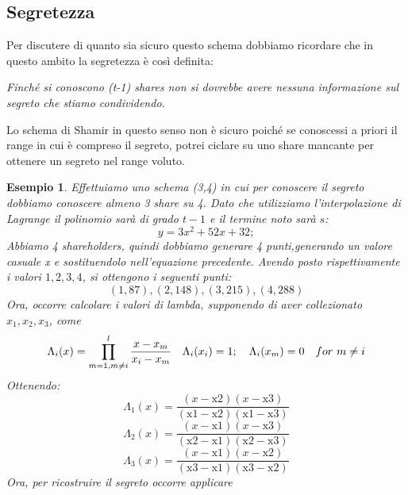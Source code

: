 \documentclass{book}
\newtheorem{esempio}{\textcolor{Grey1}{Esempio}}
\begin{document}
\subsection{Segretezza}
Per discutere di quanto sia sicuro questo schema dobbiamo ricordare che in questo ambito la segretezza è così definita:
\begin{center}
	\emph{Finché si conoscono (t-1) shares non si dovrebbe avere nessuna informazione sul segreto che stiamo condividendo.}
\end{center}
Lo schema di Shamir in questo senso non è sicuro poiché se conoscessi a priori il range in cui è compreso il segreto, potrei ciclare su uno share mancante per ottenere un segreto nel range voluto\@.
\begin{esempio}
	Effettuiamo uno schema (3,4) in cui per conoscere il segreto dobbiamo conoscere almeno 3 share su 4\@. Dato che utilizziamo l'interpolazione di Lagrange il polinomio sarà di grado \(t-1\) e il termine noto sarà \(s\):
	\begin{equation*}
		y=3 x^2+52 x+32;
	\end{equation*}
	Abbiamo 4 shareholders, quindi dobbiamo generare 4 punti,generando un valore casuale x e sostituendolo nell'equazione precedente. Avendo posto rispettivamente i valori \(1,2,3,4\), si ottengono i seguenti punti:
	\begin{equation*}
		(1,87),(2,148),(3,215),(4,288)
	\end{equation*}
	Ora, occorre calcolare i valori di lambda, supponendo di aver collezionato \(x_{1},x_{2},x_{3}\), come
	\begin{equation*}
		\centering
		\Lambda_{i}(x)=\prod_{m=1,m\neq i}^{l}{\frac{x-x_{m}}{x_{i}-x_{m}}}\quad \Lambda_{i}(x_{i})=1;\quad \Lambda_{i}(x_{m})=0\quad for\ m\neq i
	\end{equation*}
	Ottenendo:
	\begin{equation*}
		\Lambda_{1}(x)=\frac{(x-\text{x2}) (x-\text{x3}) }{(\text{x1}-\text{x2}) (\text{x1}-\text{x3}) }
	\end{equation*}
	\begin{equation*}
		\Lambda_{2}(x)=\frac{(x-\text{x1}) (x-\text{x3}) }{(\text{x2}-\text{x1}) (\text{x2}-\text{x3}) }
	\end{equation*}
	\begin{equation*}
		\Lambda_{3}(x)= \frac{(x-\text{x1}) (x-\text{x2}) }{(\text{x3}-\text{x1}) (\text{x3}-\text{x2}) }
	\end{equation*}
	Ora, per ricostruire il segreto occorre applicare
	\begin{equation*}

\end{equation*}
\end{esempio}
\end{document}
